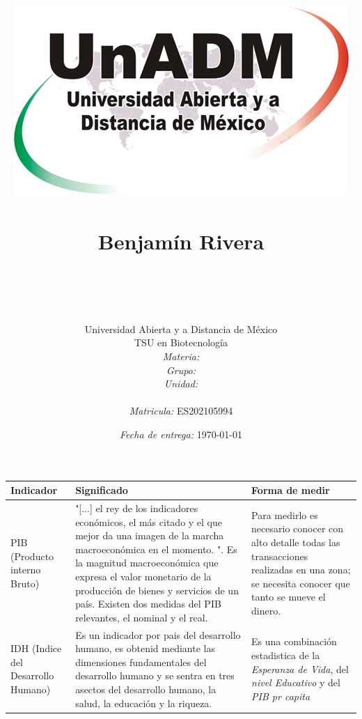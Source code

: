 \documentclass[12pt]{article}
\title{
	\includegraphics{../../../assets/logo-unadm} \\
	\ \\ Benjam\'in Rivera \\
	\bf{\titulo}\\\ \\}
\author{
	Universidad Abierta y a Distancia de México \\
	TSU en Biotecnolog\'ia \\
	\textit{Materia:} \materia \\
	\textit{Grupo:} \grupo \\
	\textit{Unidad:} \unidad \\
	\\
	\textit{Matricula:} ES202105994 }
\date{\textit{Fecha de entrega:} \today}
\begin{document}
\maketitle\newpage

\begin{longtable}{|p{3cm}|p{7cm} p{4cm}|}
\hline
	\bf Indicador &\bf Significado &\bf Forma de medir\\
\hline

	PIB (Producto interno Bruto) & "[...] el  rey  de  los  indicadores  económicos, el más citado y el que mejor da una imagen de la marcha macroeconómica en el momento. "\cite[p113]{ine}. Es la magnitud macroecon\'omica que expresa el valor monetario de la producci\'on de bienes y servicios de un pa\'is. Existen dos medidas del PIB relevantes, el nominal y el real. & Para medirlo es necesario conocer con alto detalle todas las transacciones realizadas en una zona; se necesita conocer que tanto se mueve el dinero. \\
	IDH (Indice del Desarrollo Humano) & Es un indicador por pais del desarrollo humano, es obtenid mediante las dimensiones fundamentales del desarrollo humano y se sentra en tres asectos del desarrollo humano, la salud, la educaci\'on y la riqueza. & Es una combinaci\'on estadistica de la \textit{Esperanza de Vida}, del \textit{nivel Educativo} y del \textit{PIB pr capita} \\
	

\end{longtable}
\end{document}
